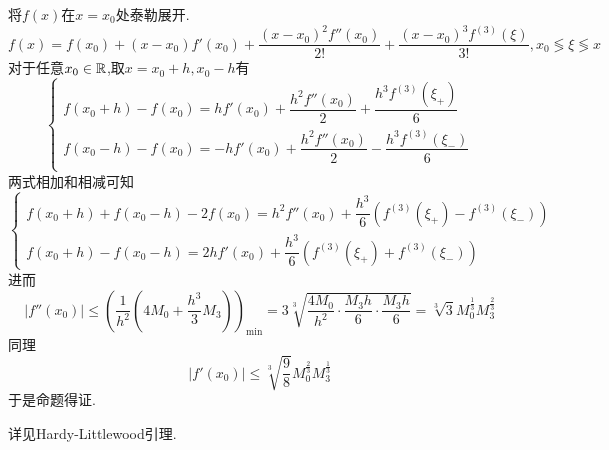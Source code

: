 \documentclass{ctexart}
\begin{document}
\begin{solution}[Proof.]
    将$f(x)$在$x=x_0$处泰勒展开.
    $$f(x)=f(x_0)+(x-x_0)f'(x_0)+\dfrac{(x-x_0)^2f''(x_0)}{2!}+\dfrac{(x-x_0)^3f^{(3)}(\xi)}{3!},x_0\lessgtr\xi\lessgtr x$$
    对于任意$x_0\in\mathbb{R}$,取$x=x_0+h,x_0-h$有
    $$\left\{\begin{array}{l}
        f(x_0+h)-f(x_0)=hf'(x_0)+\dfrac{h^2f''(x_0)}{2}+\dfrac{h^3f^{(3)}(\xi_+)}{6}\\
        f(x_0-h)-f(x_0)=-hf'(x_0)+\dfrac{h^2f''(x_0)}{2}-\dfrac{h^3f^{(3)}(\xi_-)}{6}\\
    \end{array}\right.$$
    两式相加和相减可知
    $$\left\{\begin{array}{l}
        f(x_0+h)+f(x_0-h)-2f(x_0)=h^2f''(x_0)+\dfrac{h^3}{6}\left(f^{(3)}(\xi_+)-f^{(3)}(\xi_-)\right)\\
        f(x_0+h)-f(x_0-h)=2hf'(x_0)+\dfrac{h^3}{6}\left(f^{(3)}(\xi_+)+f^{(3)}(\xi_-)\right)
    \end{array}\right.$$
    进而$$\left|f''(x_0)\right|\leqslant \left(\dfrac{1}{h^2}\left(4M_0+\dfrac{h^3}{3}M_3\right)\right)_{\min}=3\sqrt[3]{\dfrac{4M_0}{h^2}\cdot\dfrac{M_3h}{6}\cdot\dfrac{M_3h}{6}}=\sqrt[3]{3}M_0^{\frac{1}{3}}M_3^{\frac{2}{3}}$$
    同理$$\left|f'(x_0)\right|\leqslant \sqrt[3]{\dfrac{9}{8}}M_0^{\frac{2}{3}}M_3^{\frac{1}{3}}$$
    于是命题得证.
\end{solution}
\begin{problem}[Example 3.]
    详见Hardy-Littlewood引理.
\end{problem}
\end{document}
